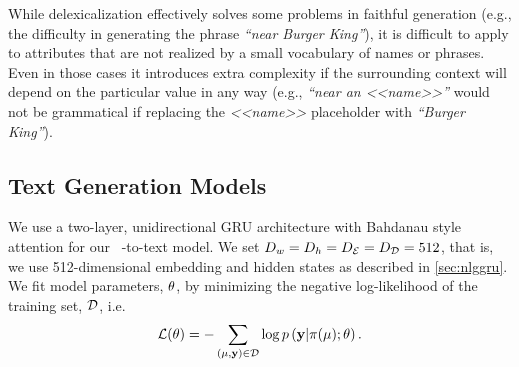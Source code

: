 While delexicalization effectively solves some problems in faithful generation
(e.g., the difficulty in generating the phrase \textit{``near Burger King''}),
it is difficult to apply to attributes that are not realized by a small
vocabulary of names or phrases. Even in those cases it introduces extra
complexity if the surrounding context will depend on the particular value in
any way (e.g., \textit{``near an <<name>>''} would not be grammatical if
replacing the \textit{<<name>>} placeholder with \textit{``Burger King''}).

\subsection{Text Generation Models}
\label{sec:fgtgm}

We use a two-layer, unidirectional GRU architecture with Bahdanau style
attention for our \sequencetosequence~\meaningrepresentation-to-text model. We
set $D_{w} = D_{h} = {D_\mathcal{E}} = {D_\mathcal{D}} = 512$, that is, we use
512-dimensional embedding and hidden states as described in
\autoref{sec:nlggru}.  We fit model parameters, $\theta$, by minimizing the
negative log-likelihood of the training set, $\mathcal{D}$, i.e.
\[\mathcal{L}(\theta) = - \sum_{(\mu, \mathbf{y}) \in \mathcal{D}  }  \log
p\left(\mathbf{y}|\pi(\mu);\theta\right).\]

